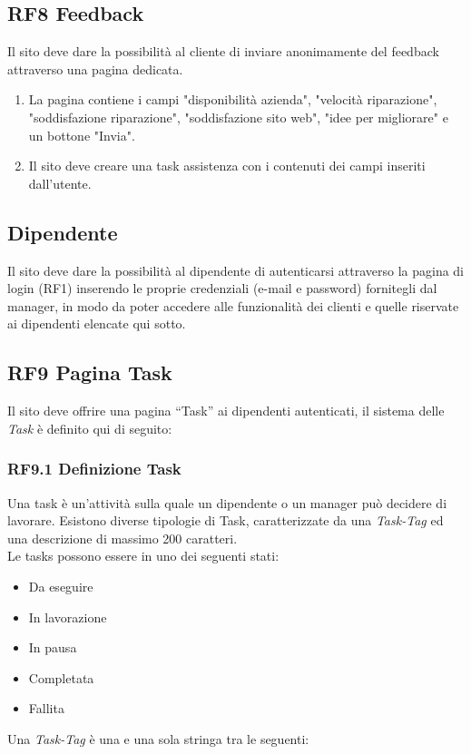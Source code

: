 \documentclass{report}
\begin{document}
\subsection*{RF8 Feedback}
Il sito deve dare la possibilità al cliente di inviare anonimamente del feedback attraverso una pagina dedicata.
\begin{enumerate}
	\item La pagina contiene i campi "disponibilità azienda", "velocità riparazione", "soddisfazione riparazione", "soddisfazione sito web", "idee per migliorare" e un bottone "Invia".

	\item Il sito deve creare una task assistenza con i contenuti dei campi inseriti dall'utente.

	
\end{enumerate}

\subsection{Dipendente}
Il sito deve dare la possibilità al dipendente di autenticarsi attraverso la pagina di login (RF1) inserendo le proprie credenziali (e-mail e password) fornitegli dal manager, in modo da poter accedere alle funzionalità dei clienti  e quelle riservate ai dipendenti elencate qui sotto.

\subsection*{RF9 Pagina Task}

Il sito deve offrire una pagina “Task” ai dipendenti autenticati, il sistema delle \textit{Task} è definito qui di seguito:

\subsubsection*{RF9.1 Definizione Task}

Una task è un'attività sulla quale un dipendente o un manager può decidere di lavorare. Esistono diverse tipologie di Task, caratterizzate da una \textit{Task-Tag} ed una descrizione di massimo 200 caratteri.\\
Le tasks possono essere in uno dei seguenti stati: 
\begin{itemize}
	\item Da eseguire
	\item In lavorazione
	\item In pausa
	\item Completata
	\item Fallita
\end{itemize}
Una \textit{Task-Tag} è una e una sola stringa tra le seguenti:
\end{document}
